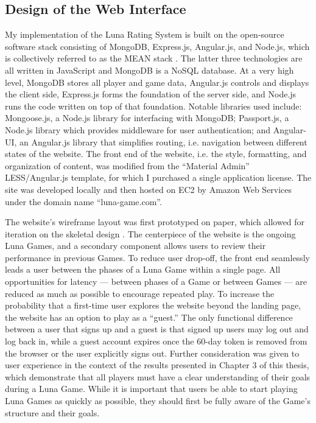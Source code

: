 \subsection{Design of the Web Interface}

My implementation of the Luna Rating System is built on the open-source software stack consisting of MongoDB, Express.js, Angular.js, and Node.js, which is collectively referred to as the MEAN stack \citep{karpov2013mean}. The latter three technologies are all written in JavaScript and MongoDB is a NoSQL database. At a very high level, MongoDB stores all player and game data, Angular.js controls and displays the client side, Express.js forms the foundation of the server side, and Node.js runs the code written on top of that foundation. Notable libraries used include: Mongoose.js, a Node.js library for interfacing with MongoDB; Passport.js, a Node.js library which provides middleware for user authentication; and Angular-UI, an Angular.js library that simplifies routing, i.e. navigation between different states of the website. The front end of the website, i.e. the style, formatting, and organization of content, was modified from the ``Material Admin'' LESS/Angular.js template, for which I purchased a single application license. The site was developed locally and then hosted on EC2 by Amazon Web Services under the domain name ``luna-game.com''.

The website's wireframe layout was first prototyped on paper, which allowed for iteration on the skeletal design \citep{rettig1994prototyping}. The centerpiece of the website is the ongoing Luna Games, and a secondary component allows users to review their performance in previous Games. To reduce user drop-off, the front end seamlessly leads a user between the phases of a Luna Game within a single page. All opportunities for latency --- between phases of a Game or between Games ---  are reduced as much as possible to encourage repeated play. To increase the probability that a first-time user explores the website beyond the landing page, the website has an option to play as a ``guest.'' The only functional difference between a user that signs up and a guest is that signed up users may log out and log back in, while a guest account expires once the $60$-day token is removed from the browser or the user explicitly signs out. Further consideration was given to user experience in the context of the results presented in Chapter $3$ of this thesis, which demonstrate that all players must have a clear understanding of their goals during a Luna Game. While it is important that users be able to start playing Luna Games as quickly as possible, they should first be fully aware of the Game's structure and their goals.

